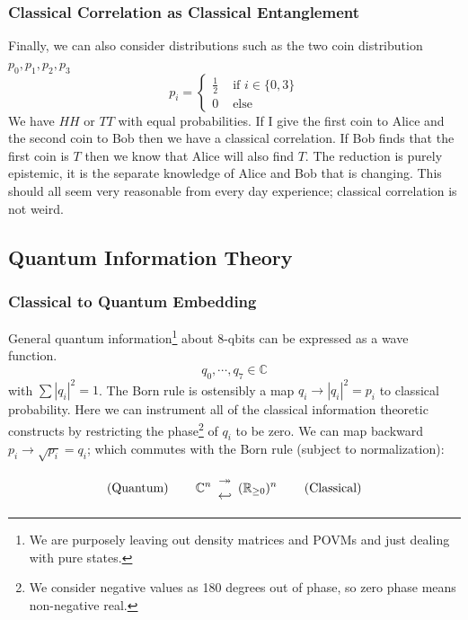 \documentclass[12pt,a4paper]{article}
\begin{document}
\subsubsection{Classical Correlation as Classical Entanglement}
Finally, we can also consider distributions such as the two coin distribution $p_0,p_1,p_2,p_3$
\[
p_i = 
\left\{
\begin{split}
\frac{1}{2} & \mbox{ if } i \in \{0,3\}\\
0 &\mbox{ else }
\end{split}
\right.
\]
We have $HH$ or $TT$ with equal probabilities.  If I give the first coin to Alice and the second coin to Bob then we have a classical correlation.  If Bob finds that the first coin is $T$ then we know that Alice will also find $T$.  The reduction is purely epistemic, it is the separate knowledge of Alice and Bob that is changing.  This should all seem very reasonable from every day experience; classical correlation is not weird.

\subsection{Quantum Information Theory}
\subsubsection{Classical to Quantum Embedding}
General quantum information\footnote{We are purposely leaving out density matrices and POVMs and just dealing with pure states.} about 8-qbits can be expressed as a wave function.
\[
   q_0,\cdots,q_{7} \in \mathbb{C}
\]
with $\sum |q_i|^2 = 1$.  The Born rule is ostensibly a map $q_i \rightarrow |q_i|^2 = p_i$ to classical probability.  Here we can instrument all of the classical information theoretic constructs by restricting the phase\footnote{We consider negative values as 180 degrees out of phase, so zero phase means non-negative real.} of $q_i$ to be zero.  We can map backward $p_i \rightarrow \sqrt{p_i} = q_i$; which commutes with the Born rule (subject to normalization):

{
\renewcommand{\arraystretch}{0.1}
\[
\text{(Quantum)} \hspace{0.3 in}
\mathbb{C}^n \begin{array}{c} \twoheadrightarrow \\ \hookleftarrow \end{array}
(\mathbb{R}_{\ge 0})^n
\hspace{0.3 in} \text{(Classical)} 
\]
}
\end{document}
